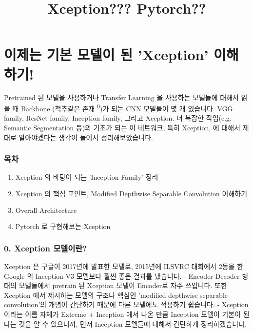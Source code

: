 \documentclass[11pt]{article}
\title{Xception??? Pytorch??}
\providecommand{\tightlist}{%
      \setlength{\itemsep}{0pt}\setlength{\parskip}{0pt}}
\begin{document}
    
    
    \maketitle
    
    

    
    \section{이제는 기본 모델이 된 'Xception'
이해하기!}\label{uxc774uxc81cuxb294-uxae30uxbcf8-uxbaa8uxb378uxc774-uxb41c-xception-uxc774uxd574uxd558uxae30}

Pretrained 된 모델을 사용하거나 Transfer Learning 을 사용하는 모델들에
대해서 읽을 때 Backbone (척추같은 존재 \textsuperscript{0})가 되는 CNN
모델들이 몇 개 있습니다. VGG family, ResNet family, Inception family,
그리고 Xception. 더 복잡한 작업(e.g. Semantic Segmentation 등)의 기초가
되는 이 네트워크, 특히 Xception, 에 대해서 제대로 알아야겠다는 생각이
들어서 정리해보았습니다.

\subsubsection{목차}\label{uxbaa9uxcc28}

\begin{enumerate}
\def\labelenumi{\arabic{enumi}.}
\tightlist
\item
  Xception 의 바탕이 되는 'Inception Family' 정리
\item
  Xception 의 핵심 포인트, Modified Depthwise Separable Convolution
  이해하기
\item
  Overall Architecture
\item
  Pytorch 로 구현해보는 Xception
\end{enumerate}

    \subsubsection{0. Xception
모델이란?}\label{xception-uxbaa8uxb378uxc774uxb780}

Xception 은 구글이 2017년에 발표한 모델로, 2015년에 ILSVRC 대회에서
2등을 한 Google 의 Inception-V3 모델보다 훨씬 좋은 결과를 냈습니다. -
Encoder-Decoder 형태의 모델들에서 pretrain 된 Xception 모델이 Encoder로
자주 쓰입니다. 또한 Xception 에서 제시하는 모델의 구조나 핵심인
'modified depthwise separable convolution'의 개념이 간단하기 때문에 다른
모델에도 적용하기 쉽습니다. - Xception 이라는 이름 자체가 Extreme +
Inception 에서 나온 만큼 Inception 모델이 기본이 된다는 것을 알 수
있으니까, 먼저 Inception 모델들에 대해서 간단하게 정리하겠습니다.
\end{document}

